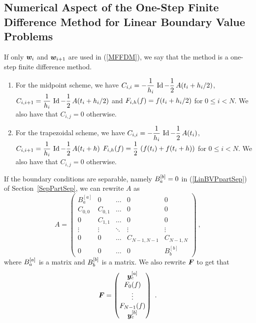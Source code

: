 \subsection{Numerical Aspect of the One-Step Finite Difference
Me\-thod for Linear Boundary Value Problems}

If only $\bm{w}_i$ and $\bm{w}_{i+1}$ are used in (\ref{MFFDM}), we
say that the method is a one-step finite difference method.

\begin{eggList}
\begin{enumerate}
\item For the midpoint scheme, we have
$\displaystyle C_{i,i} = -\frac{1}{h_i}\,\operatorname{Id} -\frac{1}{2}\,A(t_i+h_i/2)$, \\
$\displaystyle C_{i,i+1} = \frac{1}{h_i}\,\operatorname{Id} - \frac{1}{2}\,A(t_i+h_i/2)$
and $\displaystyle F_{i,h}(f) = f(t_i+h_i/2)$ for $0 \leq i < N$.
We also have that $C_{i,j} = 0$ otherwise.
\item For the trapezoidal scheme, we have
$\displaystyle C_{i,i} =  -\frac{1}{h_i}\,\operatorname{Id} -\frac{1}{2}\,A(t_i)$,
$\displaystyle C_{i,i+1} = \frac{1}{h_i}\,\operatorname{Id} -\frac{1}{2}\,A(t_i+h)$
$\displaystyle F_{i,h}(f) = \frac{1}{2}\,\left( f(t_i) + f(t_i+h) \right)$
for $0 \leq i < N$.  We also have that $C_{i,j} = 0$ otherwise.
\end{enumerate}
\end{eggList}

If the boundary conditions are separable, namely $\displaystyle B_a^{[b]}=0$ in
(\ref{LinBVPpartSep}) of Section~\ref{SepPartSep}, we can rewrite $A$ as
\begin{equation} \label{sepM}
A = \begin{pmatrix}
B_a^{[a]} & 0 & \ldots & 0 & 0 \\
C_{0,0} & C_{0,1} & \ldots & 0 & 0 \\
0 & C_{1,1} & \ldots & 0 & 0 \\
\vdots & \vdots & \ddots & \vdots & \vdots \\
0 & 0 & \ldots & C_{N-1,N-1} & C_{N-1,N} \\
0 & 0 & \ldots & 0 & B_b^{[b]}
\end{pmatrix} \ ,
\end{equation}
where $\displaystyle B_a^{[a]}$ is a  matrix and
$\displaystyle B_b^{[b]}$ is a  matrix.  We also rewrite
$\bm{F}$ to get that
\[
\bm{F} = \begin{pmatrix} \bm{y}_c^{[a]} \\ F_0(f) \\ \vdots \\
 F_{N-1}(f) \\ \bm{y}_c^{[b]} \end{pmatrix} \ .
\]

